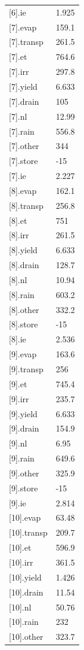 {\begin{longtable}{p{}p{}}
{}[6].ie & 1.925\\
{}[7].evap & 159.1\\
{}[7].transp & 261.5\\
{}[7].et & 764.6\\
{}[7].irr & 297.8\\
{}[7].yield & 6.633\\
{}[7].drain & 105\\
{}[7].nl & 12.99\\
{}[7].rain & 556.8\\
{}[7].other & 344\\
{}[7].store & -15\\
{}[7].ie & 2.227\\
{}[8].evap & 162.1\\
{}[8].transp & 256.8\\
{}[8].et & 751\\
{}[8].irr & 261.5\\
{}[8].yield & 6.633\\
{}[8].drain & 128.7\\
{}[8].nl & 10.94\\
{}[8].rain & 603.2\\
{}[8].other & 332.2\\
{}[8].store & -15\\
{}[8].ie & 2.536\\
{}[9].evap & 163.6\\
{}[9].transp & 256\\
{}[9].et & 745.4\\
{}[9].irr & 235.7\\
{}[9].yield & 6.633\\
{}[9].drain & 154.9\\
{}[9].nl & 6.95\\
{}[9].rain & 649.6\\
{}[9].other & 325.9\\
{}[9].store & -15\\
{}[9].ie & 2.814\\
{}[10].evap & 63.48\\
{}[10].transp & 209.7\\
{}[10].et & 596.9\\
{}[10].irr & 361.5\\
{}[10].yield & 1.426\\
{}[10].drain & 11.54\\
{}[10].nl & 50.76\\
{}[10].rain & 232\\
{}[10].other & 323.7\\

\end{longtable}}
